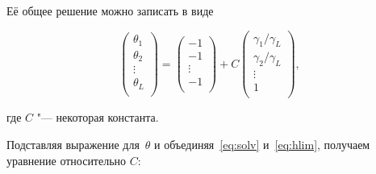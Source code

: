 Её общее решение можно записать в виде

\begin{equation}

\label{eq:solv}

\left(

\begin{array}{c}

\theta_1\\

\theta_2\\

\vdots\\

\theta_L\\

\end{array}

\right)

=

\left(

\begin{array}{c}

-1\\

-1\\

\vdots\\

-1\\

\end{array}

\right)

+ C

\left(

\begin{array}{c}

\gamma_1/\gamma_L\\

\gamma_2/\gamma_L\\

\vdots\\

1\\

\end{array}

\right),

\end{equation}

где $C$ "--- некоторая константа.

Подставляя выражение для~$\theta$ и объединяя~\eqref{eq:solv} и~\eqref{eq:hlim}, получаем уравнение относительно $C$:

